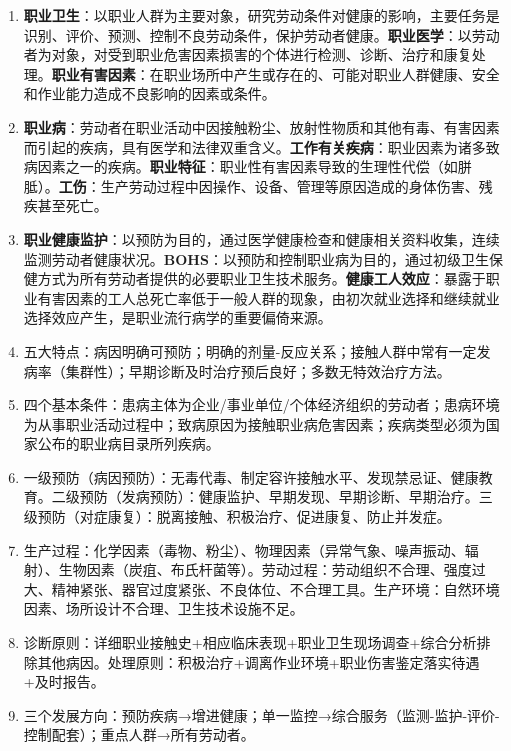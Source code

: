 \begin{enumerate}[leftmargin=*, itemsep=5pt]
    \item \textbf{职业卫生}：以职业人群为主要对象，研究劳动条件对健康的影响，主要任务是识别、评价、预测、控制不良劳动条件，保护劳动者健康。\textbf{职业医学}：以劳动者为对象，对受到职业危害因素损害的个体进行检测、诊断、治疗和康复处理。\textbf{职业有害因素}：在职业场所中产生或存在的、可能对职业人群健康、安全和作业能力造成不良影响的因素或条件。
    \item \textbf{职业病}：劳动者在职业活动中因接触粉尘、放射性物质和其他有毒、有害因素而引起的疾病，具有医学和法律双重含义。\textbf{工作有关疾病}：职业因素为诸多致病因素之一的疾病。\textbf{职业特征}：职业性有害因素导致的生理性代偿（如胼胝）。\textbf{工伤}：生产劳动过程中因操作、设备、管理等原因造成的身体伤害、残疾甚至死亡。
    \item \textbf{职业健康监护}：以预防为目的，通过医学健康检查和健康相关资料收集，连续监测劳动者健康状况。\textbf{BOHS}：以预防和控制职业病为目的，通过初级卫生保健方式为所有劳动者提供的必要职业卫生技术服务。\textbf{健康工人效应}：暴露于职业有害因素的工人总死亡率低于一般人群的现象，由初次就业选择和继续就业选择效应产生，是职业流行病学的重要偏倚来源。
    \item 五大特点：病因明确可预防；明确的剂量-反应关系；接触人群中常有一定发病率（集群性）；早期诊断及时治疗预后良好；多数无特效治疗方法。
    \item 四个基本条件：患病主体为企业/事业单位/个体经济组织的劳动者；患病环境为从事职业活动过程中；致病原因为接触职业病危害因素；疾病类型必须为国家公布的职业病目录所列疾病。
    \item 一级预防（病因预防）：无毒代毒、制定容许接触水平、发现禁忌证、健康教育。二级预防（发病预防）：健康监护、早期发现、早期诊断、早期治疗。三级预防（对症康复）：脱离接触、积极治疗、促进康复、防止并发症。
    \item 生产过程：化学因素（毒物、粉尘）、物理因素（异常气象、噪声振动、辐射）、生物因素（炭疽、布氏杆菌等）。劳动过程：劳动组织不合理、强度过大、精神紧张、器官过度紧张、不良体位、不合理工具。生产环境：自然环境因素、场所设计不合理、卫生技术设施不足。
    \item 诊断原则：详细职业接触史+相应临床表现+职业卫生现场调查+综合分析排除其他病因。处理原则：积极治疗+调离作业环境+职业伤害鉴定落实待遇+及时报告。
    \item 三个发展方向：预防疾病→增进健康；单一监控→综合服务（监测-监护-评价-控制配套）；重点人群→所有劳动者。
\end{enumerate}

\newpage

\newpage